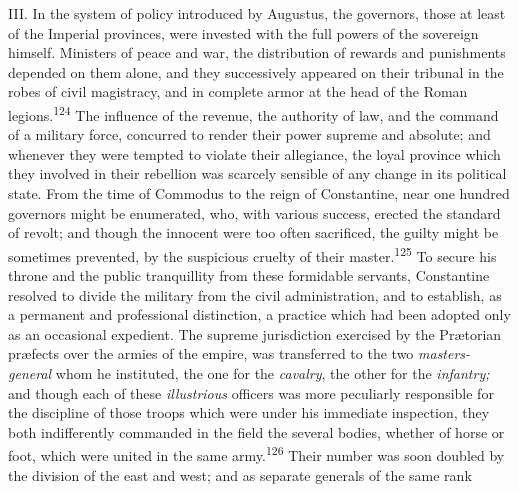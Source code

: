 

III. In the system of policy introduced by Augustus, the
governors, those at least of the Imperial provinces, were
invested with the full powers of the sovereign himself. Ministers
of peace and war, the distribution of rewards and punishments
depended on them alone, and they successively appeared on their
tribunal in the robes of civil magistracy, and in complete armor
at the head of the Roman legions.\textsuperscript{124} The influence of the
revenue, the authority of law, and the command of a military
force, concurred to render their power supreme and absolute; and
whenever they were tempted to violate their allegiance, the loyal
province which they involved in their rebellion was scarcely
sensible of any change in its political state. From the time of
Commodus to the reign of Constantine, near one hundred governors
might be enumerated, who, with various success, erected the
standard of revolt; and though the innocent were too often
sacrificed, the guilty might be sometimes prevented, by the
suspicious cruelty of their master.\textsuperscript{125} To secure his throne and
the public tranquillity from these formidable servants,
Constantine resolved to divide the military from the civil
administration, and to establish, as a permanent and professional
distinction, a practice which had been adopted only as an
occasional expedient. The supreme jurisdiction exercised by the
Prætorian præfects over the armies of the empire, was transferred
to the two \textit{masters-general} whom he instituted, the one for the
\textit{cavalry}, the other for the \textit{infantry;} and though each of these
\textit{illustrious} officers was more peculiarly responsible for the
discipline of those troops which were under his immediate
inspection, they both indifferently commanded in the field the
several bodies, whether of horse or foot, which were united in
the same army.\textsuperscript{126} Their number was soon doubled by the division
of the east and west; and as separate generals of the same rank

